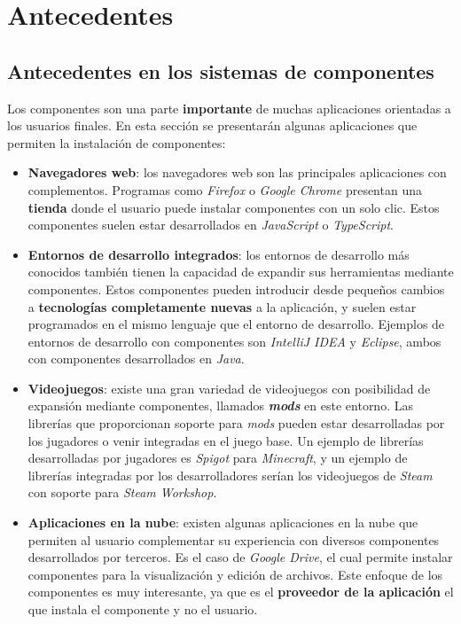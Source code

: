 \chapter{Antecedentes}\label{ch:antecedentes}


\section{Antecedentes en los sistemas de componentes}
\label{sec:antecedentes-en-los-sistemas-de-componentes}

Los componentes son una parte \textbf{importante} de muchas aplicaciones
orientadas a los usuarios finales.
En esta sección se presentarán algunas aplicaciones que permiten
la instalación de componentes:

\begin{itemize}
    \item \textbf{Navegadores web}: los navegadores web
    son las principales aplicaciones con complementos.
    Programas como \textit{Firefox}\cite{FIREFOX} o
    \textit{Google Chrome}\cite{CHROME}
    presentan una \textbf{tienda} donde el usuario puede instalar
    componentes con un solo clic.
    Estos componentes suelen estar desarrollados en \textit{JavaScript}
    o \textit{TypeScript}.
    \item \textbf{Entornos de desarrollo integrados}: los entornos de
    desarrollo más conocidos también tienen la capacidad de expandir
    sus herramientas mediante componentes.
    Estos componentes pueden introducir desde pequeños cambios
    a \textbf{tecnologías completamente nuevas} a la aplicación, y suelen
    estar programados en el mismo lenguaje que el entorno de desarrollo.
    Ejemplos de entornos de desarrollo con componentes
    son \textit{IntelliJ IDEA}\cite{INTELLIJIDEA} y \textit{Eclipse}\cite{ECLIPSE},
    ambos con componentes desarrollados en \textit{Java}\cite{JAVA}.
    \item \textbf{Videojuegos}: existe una gran variedad
    de videojuegos con posibilidad de expansión mediante
    componentes, llamados \textit{\textbf{mods}} en este entorno.
    Las librerías que proporcionan soporte para \textit{mods}
    pueden estar desarrolladas por los jugadores o venir
    integradas en el juego base.
    Un ejemplo de librerías desarrolladas por jugadores es
    \textit{Spigot}\cite{SPIGOT} para \textit{Minecraft}, y un ejemplo
    de librerías integradas por los desarrolladores
    serían los videojuegos de \textit{Steam} con soporte
    para \textit{Steam Workshop}\cite{STEAM_WORKSHOP}.
    \item \textbf{Aplicaciones en la nube}: existen
    algunas aplicaciones en la nube que permiten
    al usuario complementar su experiencia con diversos
    componentes desarrollados por terceros.
    Es el caso de \textit{Google Drive}, el cual permite
    instalar componentes para la visualización y
    edición de archivos.
    Este enfoque de los componentes es muy interesante,
    ya que es el \textbf{proveedor de la aplicación} el que
    instala el componente y no el usuario.
\end{itemize}


